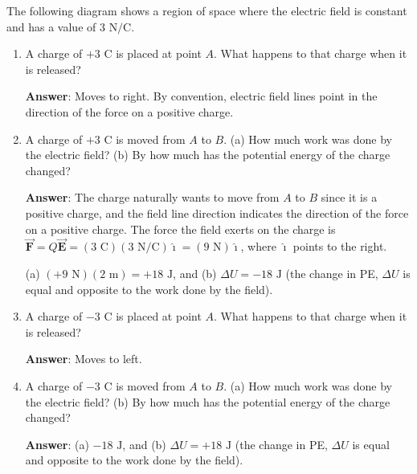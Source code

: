 \documentclass{article}
\newcommand{\ihat}[0]{\hat{\boldsymbol{\imath}}}
\newcommand{\bfvec}[1]{\vec{\mathbf{#1}}}
\begin{document}
The following diagram shows a region of space where the electric field is constant and has a value of $3\text{ N/C}$.



\begin{enumerate}

  \item A charge of $+3\text{ C}$ is placed at point $A$. What happens to that charge when it is released?

        \ifsolutions
        {\bf Answer}: Moves to right. By convention, electric field lines point in the direction of the force on a positive charge.
        \else

        \vskip 36pt
        \fi

  \item A charge of $+3\text{ C}$ is moved from $A$ to $B$. (a) How much work was done by the electric field? (b) By how much has the potential energy of the charge changed?

        \ifsolutions
        {\bf Answer}: The charge naturally wants to move from $A$ to $B$ since it is a positive charge, and the field line direction indicates the direction of the force on a positive charge. The force the field exerts on the charge is $\bfvec{F}=Q\bfvec{E}=(3\text{ C})(3\text { N/C})\ihat = (9\text{ N})\ihat$, where $\ihat$ points to the right.

        (a) $(+9 \text{ N})(2\text { m})=+18\text{ J}$, and (b) $\Delta U = -18\text{ J}$ (the change in PE, $\Delta U$ is equal and opposite to the work done by the field).
        \else

        \vskip 36pt
        \fi

  \item A charge of $-3\text{ C}$ is placed at point $A$. What happens to that charge when it is released?

        \ifsolutions
        {\bf Answer}: Moves to left.
        \else

        \vskip 48pt
        \fi

  \item A charge of $-3\text{ C}$ is moved from $A$ to $B$. (a) How much work was done by the electric field? (b) By how much has the potential energy of the charge changed?

        \ifsolutions
        {\bf Answer}: (a) $-18\text{ J}$, and (b) $\Delta U = +18\text{ J}$ (the change in PE, $\Delta U$ is equal and opposite to the work done by the field).
        \else


\end{enumerate}
\end{document}
